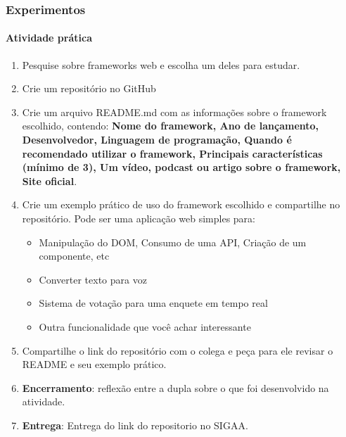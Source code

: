 \documentclass[
	9pt, %
	t, %
]{beamer}
\begin{document}
\begin{frame}
	\frametitle{Experimentos}
	\framesubtitle{Atividade prática}

	\begin{enumerate}
		\item Pesquise sobre frameworks web e escolha um deles para estudar.
		\item Crie um repositório no GitHub
		\item Crie um arquivo README.md com as informações sobre o framework escolhido, contendo: {\small \textbf{Nome do framework, Ano de lançamento, Desenvolvedor, Linguagem de programação, Quando é recomendado utilizar o framework, Principais características (mínimo de 3), Um vídeo, podcast ou artigo sobre o framework, Site oficial}}.
		\item Crie um exemplo prático de uso do framework escolhido e compartilhe no repositório. Pode ser uma aplicação web simples para:
		\begin{itemize}
			\item Manipulação do DOM, Consumo de uma API, Criação de um componente, etc
			\item Converter texto para voz
			\item Sistema de votação para uma enquete em tempo real
			\item Outra funcionalidade que você achar interessante
		\end{itemize}
		\item Compartilhe o link do repositório com o colega e peça para ele revisar o README e seu exemplo prático.
		\item \textbf{Encerramento}: reflexão entre a dupla sobre o que foi desenvolvido na atividade.
		\item \textbf{Entrega}: Entrega do link do repositorio no SIGAA.
	\end{enumerate}

\end{frame}
\end{document}
